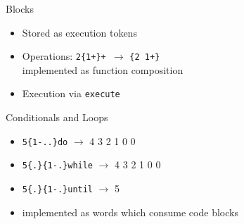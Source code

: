 \documentclass{beamer}
\begin{document}
%
%
%
%
%
\begin{frame}
    Blocks

    \begin{itemize}
        \item Stored as execution tokens
        \item Operations: \texttt{2\{1+\}+ }$\rightarrow$ \texttt{\{2 1+\}} \\
              implemented as function composition
        \item Execution via \texttt{execute}
    \end{itemize}
\end{frame}

\begin{frame}[fragile]
    \vspace{0.5cm}
    Conditionals and Loops

    \begin{itemize}
        \item \texttt{5\{1-..\}do} $\rightarrow$ 4 3 2 1 0 0
        \item \texttt{5\{.\}\{1-.\}while}  $\rightarrow$  4 3 2 1 0 0
        \item \texttt{5\{.\}\{1-.\}until}  $\rightarrow$  5
        \item implemented as words which consume code blocks
    \end{itemize}
\end{frame}
\end{document}
